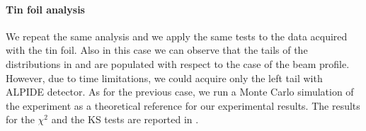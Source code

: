 \documentclass[../../main/main.tex]{subfiles}
\begin{document}
\paragraph{Tin foil analysis}
We repeat the same analysis and we apply the same tests to the data acquired with the tin foil. Also in this case we can observe that the tails of the distributions in  and  are populated with respect to the case of the beam profile. However, due to time limitations, we could acquire only the left tail with ALPIDE detector.
As for the previous case, we run a Monte Carlo simulation of the experiment as a theoretical reference for our experimental results. The results for the \( \chi^{2} \) and the KS tests are reported in .

%




\end{document}
